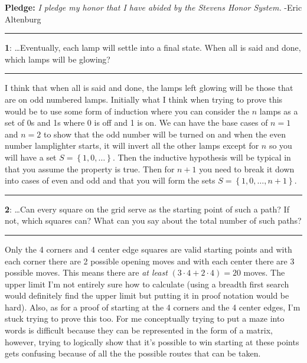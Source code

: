\documentclass[11pt]{article}
\newcommand\question[2]{\vspace{.25in}\hrule\textbf{#1}: #2\vspace{.5em}\hrule\vspace{.10in}}
\begin{document}
\raggedright
\newcommand\NAME{Eric Altenburg}  %
\newcommand\COURSE{MA-240}
\newcommand\HWNUM{7}              %


\textbf{Pledge:} \textit{I pledge my honor that I have abided by the Stevens Honor System.} -Eric Altenburg

\question{1}{\ldots Eventually, each lamp will settle into a final state. When all is said and done, which lamps will be glowing?}

I think that when all is said and done, the lamps left glowing will be those that are on odd numbered lamps. Initially what I think when trying to prove this would be to use some form of induction where you can consider the $n$ lamps as a set of 0s and 1s where 0 is off and 1 is on. We can have the base cases of $n=1$ and $n=2$ to show that the odd number will be turned on and when the even number lamplighter starts, it will invert all the other lamps except for $n$ so you will have a set $S = \left\{1, 0, \ldots\right\}$. Then the inductive hypothesis will be typical in that you assume the property is true. Then for $n+1$ you need to break it down into cases of even and odd and that you will form the sets $S = \left\{1, 0, \ldots, n+1\right\}$.

\question{2}{\ldots Can every square on the grid serve as the starting point of such a path? If not, which squares can? What can you say about the total number of such paths?}

Only the 4 corners and 4 center edge squares are valid starting points and with each corner there are 2 possible opening moves and with each center there are 3 possible moves. This means there are \textit{at least} $(3\cdot4 + 2 \cdot 4) = 20$ moves. The upper limit I'm not entirely sure how to calculate (using a breadth first search would definitely find the upper limit but putting it in proof notation would be hard). Also, as for a proof of starting at the 4 corners and the 4 center edges, I'm stuck trying to prove this too. For me conceptually trying to put a maze into words is difficult because they can be represented in the form of a matrix, however, trying to logically show that it's possible to win starting at these points gets confusing because of all the the possible routes that can be taken.
\end{document}
